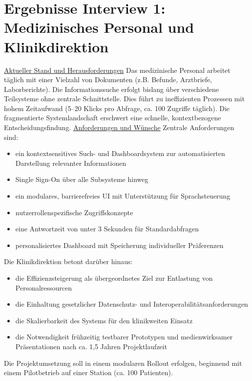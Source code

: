 \section{Ergebnisse Interview 1: Medizinisches Personal und Klinikdirektion}
\underline{Aktueller Stand und Herausforderungen}
Das medizinische Personal arbeitet täglich mit einer Vielzahl von Dokumenten (z.B. Befunde, Arztbriefe, Laborberichte). Die Informationssuche erfolgt bislang über verschiedene Teilsysteme ohne zentrale Schnittstelle. Dies führt zu ineffizienten Prozessen mit hohem Zeitaufwand (5–20 Klicks pro Abfrage, ca. 100 Zugriffe täglich). Die fragmentierte Systemlandschaft erschwert eine schnelle, kontextbezogene Entscheidungsfindung.
\underline{Anforderungen und Wünsche}
Zentrale Anforderungen sind:
\begin{itemize}
	\item ein kontextsensitives Such- und Dashboardsystem zur automatisierten Darstellung relevanter Informationen
	\item Single Sign-On über alle Subsysteme hinweg
	\item ein modulares, barrierefreies UI mit Unterstützung für Sprachsteuerung
	\item nutzerrollenspezifische Zugriffskonzepte
	\item eine Antwortzeit von unter 3 Sekunden für Standardabfragen
	\item personalisiertes Dashboard mit Speicherung individueller Präferenzen
\end{itemize}
Die Klinikdirektion betont darüber hinaus:
\begin{itemize}
	\item die Effizienzsteigerung als übergeordnetes Ziel zur Entlastung von Personalressourcen
	\item die Einhaltung gesetzlicher Datenschutz- und Interoperabilitätsanforderungen
	\item die Skalierbarkeit des Systems für den klinikweiten Einsatz
	\item die Notwendigkeit frühzeitig testbarer Prototypen und medienwirksamer Präsentationen nach ca. 1,5 Jahren Projektlaufzeit
\end{itemize}
Die Projektumsetzung soll in einem modularen Rollout erfolgen, beginnend mit einem Pilotbetrieb auf einer Station (ca. 100 Patienten).
